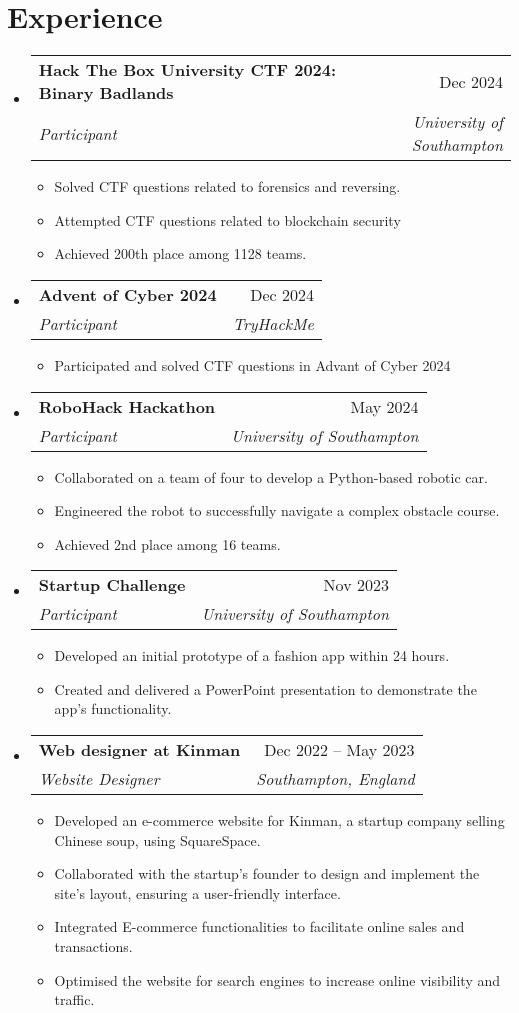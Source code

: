 \documentclass[letterpaper,10pt]{article}
\makeatletter
\newcommand{\resumeItem}[1]{
  \item\small{
    {#1 \vspace{-2pt}}
  }
}
\newcommand{\resumeSubheading}[4]{
  \vspace{-2pt}\item
    \begin{tabular*}{0.97\textwidth}[t]{l@{\extracolsep{\fill}}r}
      \textbf{#1} & #2 \\
      \textit{\small#3} & \textit{\small #4} \\
    \end{tabular*}\vspace{-7pt}
}
\newcommand{\resumeSubHeadingListStart}{\begin{itemize}[leftmargin=0.15in, label={}]}
\newcommand{\resumeSubHeadingListEnd}{\end{itemize}}
\newcommand{\resumeItemListStart}{\begin{itemize}}
\newcommand{\resumeItemListEnd}{\end{itemize}\vspace{-5pt}}
\makeatother
\begin{document}
\section{Experience}

\resumeSubHeadingListStart
    \resumeSubheading
      {Hack The Box University CTF 2024: Binary Badlands}{Dec 2024}
      {Participant}{University of Southampton}
      \resumeItemListStart
        \resumeItem{Solved CTF questions related to forensics and reversing.}
        \resumeItem{Attempted CTF questions related to blockchain security}
        \resumeItem{Achieved 200th place among 1128 teams.}
      \resumeItemListEnd
\resumeSubHeadingListEnd

\resumeSubHeadingListStart
    \resumeSubheading
      {Advent of Cyber 2024}{Dec 2024}
      {Participant}{TryHackMe}
      \resumeItemListStart
        \resumeItem{Participated and solved CTF questions in Advant of Cyber 2024}
      \resumeItemListEnd
\resumeSubHeadingListEnd

\resumeSubHeadingListStart
    \resumeSubheading
      {RoboHack Hackathon}{May 2024}
      {Participant}{University of Southampton}
      \resumeItemListStart
        \resumeItem{Collaborated on a team of four to develop a Python-based robotic car.}
        \resumeItem{Engineered the robot to successfully navigate a complex obstacle course.}
        \resumeItem{Achieved 2nd place among 16 teams.}
      \resumeItemListEnd
\resumeSubHeadingListEnd

\resumeSubHeadingListStart
    \resumeSubheading
      {Startup Challenge}{Nov 2023}
      {Participant}{University of Southampton}
      \resumeItemListStart
        \resumeItem{Developed an initial prototype of a fashion app within 24 hours.}
        \resumeItem{Created and delivered a PowerPoint presentation to demonstrate the app's functionality.}
      \resumeItemListEnd
\resumeSubHeadingListEnd

\resumeSubHeadingListStart
    \resumeSubheading
      {Web designer at Kinman}{Dec 2022 -- May 2023}
      {Website Designer}{Southampton, England}
      \resumeItemListStart
        \resumeItem{Developed an e-commerce website for Kinman, a startup company selling Chinese soup, using SquareSpace.}
        \resumeItem{Collaborated with the startup's founder to design and implement the site's layout, ensuring a user-friendly interface.}
        \resumeItem{Integrated E-commerce functionalities to facilitate online sales and transactions.}
        \resumeItem{Optimised the website for search engines to increase online visibility and traffic.}
      \resumeItemListEnd
\resumeSubHeadingListEnd
\end{document}
